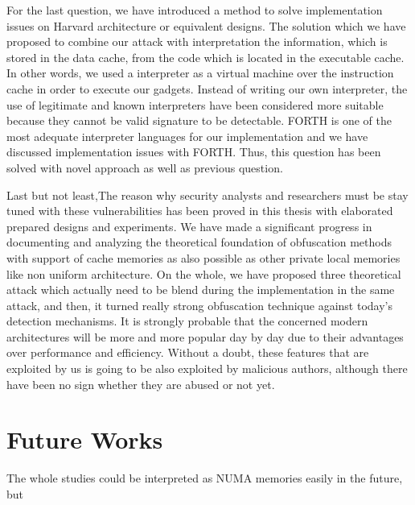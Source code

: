 For the last question, we have introduced a method to solve implementation issues on Harvard architecture or equivalent designs. The solution which we have proposed to combine our attack with interpretation the information, which is stored in the data cache, from the code which is located in the executable cache. In other words, we used a interpreter as a virtual machine over the instruction cache in order to execute our gadgets. Instead of writing our own interpreter, the use of legitimate and known interpreters have been considered more suitable because they cannot be valid signature to be detectable. FORTH is one of the most adequate interpreter languages for our implementation and we have discussed implementation issues with FORTH. Thus, this question has been solved with novel approach as well as previous question.

Last but not least,The reason why security analysts and researchers must be stay tuned with these vulnerabilities has been proved in this thesis with elaborated prepared designs and experiments. We have made a significant progress in documenting and analyzing the theoretical foundation of obfuscation methods with support of cache memories as also possible as other private local memories like non uniform architecture. On the whole, we have proposed three theoretical attack which actually need to be blend during the implementation in the same attack, and then, it turned really strong obfuscation technique against today's detection mechanisms. It is strongly probable that the concerned modern architectures will be more and more popular day by day due to their advantages over performance and efficiency. Without a doubt, these features that are exploited by us is going to be also exploited by malicious authors, although there have been no sign whether they are abused or not yet.

\section*{Future Works}
The whole studies could be interpreted as NUMA memories easily in the future, but